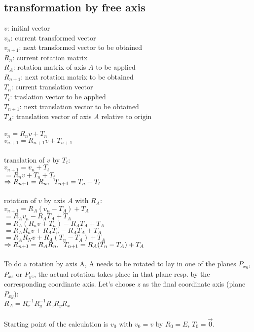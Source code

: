\documentclass[a4paper]{article}
\newcommand{\spc}{\hspace{0.2cm}}
\begin{document}
\subsection{transformation by free axis}
$v$: initial vector\\
$v_n$: current transformed vector\\
$v_{n+1}$: next transformed vector to be obtained\\
$R_n$: current rotation matrix\\
$R_A$: rotation matrix of axis $A$ to be applied\\
$R_{n+1}$: next rotation matrix to be obtained\\
$T_n$: current translation vector\\
$T_t$: traslation vector to be applied\\
$T_{n+1}$: next translation vector to be obtained\\
$T_A$: translation vector of axis $A$ relative to origin\\
\\
$v_n=R_nv+T_n$\\
$v_{n+1}=R_{n+1}v+T_{n+1}$\\\\
translation of $v$ by $T_t$:\\
$v_{n+1}=v_n+T_t$\\
$=R_nv+T_n+T_t$\\
$\Rightarrow R_{n+1}=R_n, \spc T_{n+1}=T_n+T_t$\\
\\
rotation of $v$ by axis $A$ with $R_A$:\\
$v_{n+1}=R_A(v_n-T_A)+T_A$\\
$=R_Av_n-R_AT_A+T_A$\\
$=R_A(R_nv+T_n)-R_AT_A+T_A$\\
$=R_AR_nv+R_AT_n-R_AT_A+T_A$\\
$=R_AR_Nv+R_A(T_n-T_A)+T_A$\\
$\Rightarrow R_{n+1}=R_AR_n, \spc T_{n+1}=R_A(T_n-T_A)+T_A$\\
\\
To do a rotation by axis A, A needs to be rotated to lay in one of the planes $P_{xy}$, $P_{xz}$ or $P_{yz}$, the actual rotation takes place in that plane
resp. by the corresponding coordinate axis. Let's choose $z$ as the final coordinate axis (plane $P_{xy}$):\\
$R_A=R_x^{-1}R_y^{-1}R_zR_yR_x$\\
\\

Starting point of the calculation is $v_0$ with $v_0=v$ by $R_0=E$, $T_0=\vec{0}$.
\end{document}
